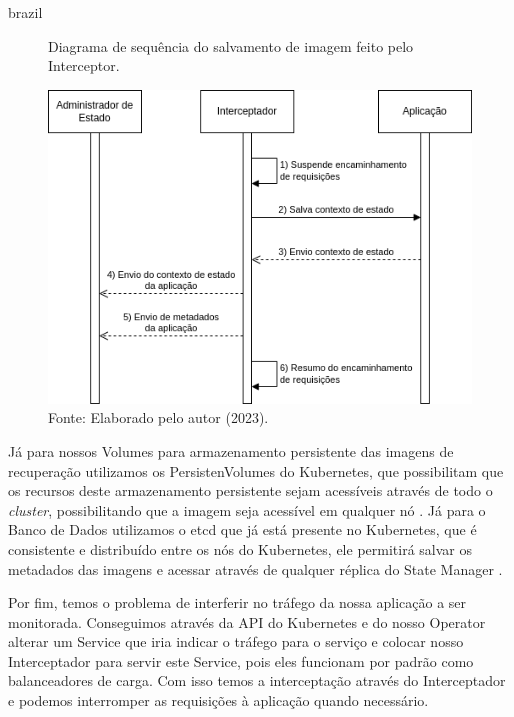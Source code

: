 \begin{otherlanguage*}{brazil}
\begin{figure}[h]
\centering
\caption{Diagrama de sequência do salvamento de imagem feito pelo Interceptor.}
\includegraphics[scale=0.72]{images/interceptor-checkpoint.png}
\caption*{Fonte: Elaborado pelo autor (2023).}
\label{fig:interceptor-checkpoint}
\end{figure}

Já para nossos Volumes para armazenamento persistente das imagens de recuperação
utilizamos os PersistenVolumes do Kubernetes, que possibilitam que os recursos
deste armazenamento persistente sejam acessíveis através de todo o \textit{cluster},
possibilitando que a imagem seja acessível em qualquer nó \cite{kubernetes:persistent-volumes}.
Já para o Banco de Dados utilizamos o etcd que já está presente no Kubernetes, que é
consistente e distribuído entre os nós do Kubernetes, ele permitirá salvar os metadados
das imagens e acessar através de qualquer réplica do State Manager \cite{etcd}
\cite{kubernetes:etcd}.

Por fim, temos o problema de interferir no tráfego da nossa aplicação a ser monitorada.
Conseguimos através da API do Kubernetes e do nosso Operator alterar um Service que iria
indicar o tráfego para o serviço e colocar nosso Interceptador para servir este Service,
pois eles funcionam por padrão como balanceadores de carga. Com isso temos a interceptação
através do Interceptador e podemos interromper as requisições à aplicação quando necessário.

\end{otherlanguage*}
